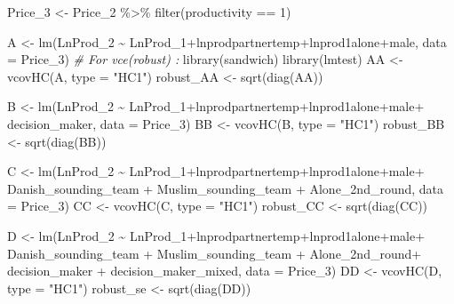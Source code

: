 \documentclass[
]{article}
\newenvironment{Shaded}{\begin{snugshade}}{\end{snugshade}}
\newcommand{\AttributeTok}[1]{\textcolor[rgb]{0.77,0.63,0.00}{#1}}
\newcommand{\CommentTok}[1]{\textcolor[rgb]{0.56,0.35,0.01}{\textit{#1}}}
\newcommand{\DecValTok}[1]{\textcolor[rgb]{0.00,0.00,0.81}{#1}}
\newcommand{\FunctionTok}[1]{\textcolor[rgb]{0.00,0.00,0.00}{#1}}
\newcommand{\NormalTok}[1]{#1}
\newcommand{\OtherTok}[1]{\textcolor[rgb]{0.56,0.35,0.01}{#1}}
\newcommand{\SpecialCharTok}[1]{\textcolor[rgb]{0.00,0.00,0.00}{#1}}
\newcommand{\StringTok}[1]{\textcolor[rgb]{0.31,0.60,0.02}{#1}}
\begin{document}
\begin{Shaded}
\begin{Highlighting}[]
\NormalTok{Price\_3 }\OtherTok{\textless{}{-}}\NormalTok{ Price\_2 }\SpecialCharTok{\%\textgreater{}\%}
  \FunctionTok{filter}\NormalTok{(productivity }\SpecialCharTok{==} \DecValTok{1}\NormalTok{)}

\NormalTok{A }\OtherTok{\textless{}{-}} \FunctionTok{lm}\NormalTok{(LnProd\_2 }\SpecialCharTok{\textasciitilde{}}\NormalTok{ LnProd\_1}\SpecialCharTok{+}\NormalTok{lnprodpartnertemp}\SpecialCharTok{+}\NormalTok{lnprod1alone}\SpecialCharTok{+}\NormalTok{male, }\AttributeTok{data =}\NormalTok{ Price\_3)}
\CommentTok{\# For vce(robust) :}
\FunctionTok{library}\NormalTok{(sandwich)}
\FunctionTok{library}\NormalTok{(lmtest)}
\NormalTok{AA }\OtherTok{\textless{}{-}} \FunctionTok{vcovHC}\NormalTok{(A, }\AttributeTok{type =} \StringTok{"HC1"}\NormalTok{)}
\NormalTok{robust\_AA }\OtherTok{\textless{}{-}} \FunctionTok{sqrt}\NormalTok{(}\FunctionTok{diag}\NormalTok{(AA))}

\NormalTok{B }\OtherTok{\textless{}{-}} \FunctionTok{lm}\NormalTok{(LnProd\_2 }\SpecialCharTok{\textasciitilde{}}\NormalTok{ LnProd\_1}\SpecialCharTok{+}\NormalTok{lnprodpartnertemp}\SpecialCharTok{+}\NormalTok{lnprod1alone}\SpecialCharTok{+}\NormalTok{male}\SpecialCharTok{+}\NormalTok{ decision\_maker, }\AttributeTok{data =}\NormalTok{ Price\_3)}
\NormalTok{BB }\OtherTok{\textless{}{-}} \FunctionTok{vcovHC}\NormalTok{(B, }\AttributeTok{type =} \StringTok{"HC1"}\NormalTok{)}
\NormalTok{robust\_BB }\OtherTok{\textless{}{-}} \FunctionTok{sqrt}\NormalTok{(}\FunctionTok{diag}\NormalTok{(BB))}

\NormalTok{C }\OtherTok{\textless{}{-}} \FunctionTok{lm}\NormalTok{(LnProd\_2 }\SpecialCharTok{\textasciitilde{}}\NormalTok{ LnProd\_1}\SpecialCharTok{+}\NormalTok{lnprodpartnertemp}\SpecialCharTok{+}\NormalTok{lnprod1alone}\SpecialCharTok{+}\NormalTok{male}\SpecialCharTok{+}\NormalTok{ Danish\_sounding\_team }\SpecialCharTok{+}\NormalTok{ Muslim\_sounding\_team }\SpecialCharTok{+}\NormalTok{ Alone\_2nd\_round, }\AttributeTok{data =}\NormalTok{ Price\_3)}
\NormalTok{CC }\OtherTok{\textless{}{-}} \FunctionTok{vcovHC}\NormalTok{(C, }\AttributeTok{type =} \StringTok{"HC1"}\NormalTok{)}
\NormalTok{robust\_CC }\OtherTok{\textless{}{-}} \FunctionTok{sqrt}\NormalTok{(}\FunctionTok{diag}\NormalTok{(CC))}

\NormalTok{D }\OtherTok{\textless{}{-}} \FunctionTok{lm}\NormalTok{(LnProd\_2 }\SpecialCharTok{\textasciitilde{}}\NormalTok{ LnProd\_1}\SpecialCharTok{+}\NormalTok{lnprodpartnertemp}\SpecialCharTok{+}\NormalTok{lnprod1alone}\SpecialCharTok{+}\NormalTok{male}\SpecialCharTok{+}\NormalTok{ Danish\_sounding\_team }\SpecialCharTok{+}\NormalTok{ Muslim\_sounding\_team }\SpecialCharTok{+}\NormalTok{ Alone\_2nd\_round}\SpecialCharTok{+}\NormalTok{ decision\_maker }\SpecialCharTok{+}\NormalTok{ decision\_maker\_mixed, }\AttributeTok{data =}\NormalTok{ Price\_3)}
\NormalTok{DD }\OtherTok{\textless{}{-}} \FunctionTok{vcovHC}\NormalTok{(D, }\AttributeTok{type =} \StringTok{"HC1"}\NormalTok{)}
\NormalTok{robust\_se }\OtherTok{\textless{}{-}} \FunctionTok{sqrt}\NormalTok{(}\FunctionTok{diag}\NormalTok{(DD))}


\end{Highlighting}
\end{Shaded}
\end{document}
